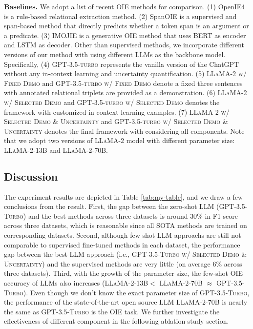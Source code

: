 \documentclass{article}
\begin{document}
\noindent\textbf{Baselines.} We adopt a list of recent OIE methods for comparison. (1) OpenIE4 \cite{mausam2016open} is a rule-based relational extraction method. (2) SpanOIE \cite{zhan2020span} is a supervised and span-based method that directly predicts whether a token span is an argument or a predicate. (3) IMOJIE \cite{kolluru2020imojie} is a generative OIE method that uses BERT as encoder and LSTM as decoder. Other than supervised methods, we incorporate different versions of our method with using different LLMs as the backbone model. Specifically, (4) \textsc{GPT-3.5-turbo} represents the vanilla version of the ChatGPT without any in-context learning and uncertainty quantification. (5) \textsc{LLaMA-2 w/ Fixed Demo} and \textsc{GPT-3.5-turbo w/ Fixed Demo} denote a fixed three sentences with annotated relational triplets are provided as a demonstration. (6) \textsc{LLaMA-2 w/ Selected Demo} and \textsc{GPT-3.5-turbo w/ Selected Demo} denotes the framework with customized in-context learning examples. (7) \textsc{LLaMA-2 w/ Selected Demo \& Uncertainty} and \textsc{GPT-3.5-turbo w/ Selected Demo \& Uncertainty} denotes the final framework with considering all components. Note that we adopt two versions of \textsc{LLaMA-2} model with different parameter size: \textsc{LLaMA-2-13B} and \textsc{LLaMA-2-70B}.

\subsection{Discussion}
The experiment results are depicted in Table \ref{tab:my-table}, and we draw a few conclusions from the result. First, the gap between the zero-shot LLM (\textsc{GPT-3.5-Turbo}) and the best methods across three datasets is around $30\%$ in F1 score across three datasets, which is reasonable since all SOTA methods are trained on corresponding datasets. Second, although few-shot LLM approachs are still not comparable to supervised fine-tuned methods in each dataset, the performance gap between the best LLM approach (i.e., \textsc{GPT-3.5-Turbo w/ Selected Demo \& Uncertainty}) and the supervised methods are very little (on average $6\%$ across three datasets). Third, with the growth of the parameter size, the few-shot OIE accuracy of LLMs also increases (\textsc{LLaMA-2-13B}$<$ \textsc{LLaMA-2-70B} $\approx$ \textsc{GPT-3.5-Turbo}). Even though we don't know the exact parameter size of \textsc{GPT-3.5-Turbo}, the performance of the state-of-the-art open source LLM \textsc{LLaMA-2-70B} is nearly the same as \textsc{GPT-3.5-Turbo} is the OIE task. We further investigate the effectiveness of different component in the following ablation study section.
\end{document}
